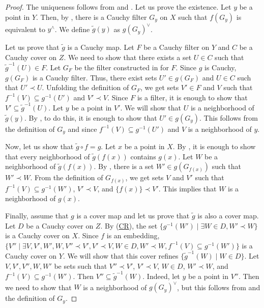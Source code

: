 \documentclass[reqno]{amsart}
\newcommand{\axref}[1]{(\hyperref[ax:#1]{#1})}
\theoremstyle{definition}
\theoremstyle{remark}
\numberwithin{figure}{section}
\newcommand{\rb}{\prec}
\begin{document}
\begin{proof}
The uniqueness follows from  and .
Let us prove the existence.
Let $y$ be a point in $Y$.
Then, by , there is a Cauchy filter $G_y$ on $X$ such that $f(G_y)$ is equivalent to $y^\wedge$.
We define $\widetilde{g}(y)$ as $g(G_y)^\vee$.

Let us prove that $\widetilde{g}$ is a Cauchy map.
Let $F$ be a Cauchy filter on $Y$ and $C$ be a Cauchy cover on $Z$.
We need to show that there exists a set $U \in C$ such that $\widetilde{g}^{-1}(U) \in F$.
Let $G_F$ be the filter constructed in  for $F$.
Since $g$ is Cauchy, $g(G_F)$ is a Cauchy filter.
Thus, there exist sets $U' \in g(G_F)$ and $U \in C$ such that $U' \rb U$.
Unfolding the definition of $G_F$, we get sets $V' \in F$ and $V$ such that $f^{-1}(V) \subseteq g^{-1}(U')$ and $V' \rb V$.
Since $F$ is a filter, it is enough to show that $V' \subseteq \widetilde{g}^{-1}(U)$.
Let $y$ be a point in $V'$.
We will show that $U$ is a neighborhood of $\widetilde{g}(y)$.
By , to do this, it is enough to show that $U' \in g(G_y)$.
This follows from the definition of $G_y$ and  since $f^{-1}(V) \subseteq g^{-1}(U')$ and $V$ is a neighborhood of $y$.

Now, let us show that $\widetilde{g} \circ f = g$.
Let $x$ be a point in $X$.
By , it is enough to show that every neighborhood of $\widetilde{g}(f(x))$ contains $g(x)$.
Let $W$ be a neighborhood of $\widetilde{g}(f(x))$.
By , there is a set $W' \in g(G_{f(x)})$ such that $W' \rb W$.
From the definition of $G_{f(x)}$, we get sets $V$ and $V'$ such that $f^{-1}(V) \subseteq g^{-1}(W')$, $V' \rb V$, and $\{ f(x) \} \rb V'$.
This implies that $W$ is a neighborhood of $g(x)$.

Finally, assume that $g$ is a cover map and let us prove that $\widetilde{g}$ is also a cover map.
Let $D$ be a Cauchy cover on $Z$.
By \axref{CR}, the set $\{ g^{-1}(W') \mid \exists W \in D, W' \rb W \}$ is a Cauchy cover on $X$.
Since $f$ is an embedding, $\{ V'' \mid \exists V,V',W',W, V'' \rb V', V' \rb V, W \in D, W' \rb W, f^{-1}(V) \subseteq g^{-1}(W') \}$ is a Cauchy cover on $Y$.
We will show that this cover refines $\{ \widetilde{g}^{-1}(W) \mid W \in D \}$.
Let $V,V',V'',W,W'$ be sets such that $V'' \rb V'$, $V' \rb V$, $W \in D$, $W' \rb W$, and $f^{-1}(V) \subseteq g^{-1}(W')$.
Then $V'' \subseteq \widetilde{g}^{-1}(W)$.
Indeed, let $y$ be a point in $V''$.
Then we need to show that $W$ is a neighborhood of $g(G_y)^\vee$, but this follows from  and the definition of $G_y$.
\end{proof}
\end{document}
